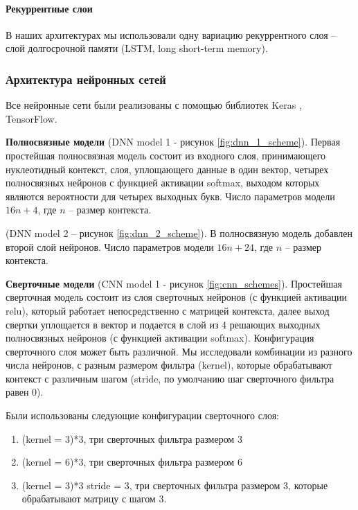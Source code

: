 \paragraph{Рекуррентные слои} В наших архитектурах мы использовали одну вариацию рекуррентного слоя -- слой долгосрочной памяти (LSTM, long short-term memory). 
  
\subsubsection{Архитектура нейронных сетей}
Все нейронные сети были реализованы с помощью библиотек Keras\cite{chollet_keras_2015} , TensorFlow.



{\bfseries Полносвязные модели} (DNN model 1 - рисунок \ref{fig:dnn_1_scheme}). Первая простейшая полносвязная модель состоит из входного слоя, принимающего нуклеотидный контекст, слоя, уплощающего данные в один вектор, четырех полносвязных нейронов с функцией активации softmax, выходом которых являются вероятности для четырех выходных букв. Число параметров модели $16n + 4$, где $n$ -- размер контекста.

(DNN model 2 -- рисунок \ref{fig:dnn_2_scheme}). В полносвязную модель добавлен второй слой нейронов. Число параметров модели $16n + 24$, где $n$ -- размер контекста.


{\bfseries Сверточные модели} (CNN model 1 - рисунок \ref{fig:cnn_schemes}).
Простейшая сверточная модель состоит из слоя сверточных нейронов (с функцией активации relu), который работает непосредственно с матрицей контекста, далее выход свертки уплощается в вектор и подается в слой из 4 решающих выходных полносвязных нейронов (с функцией активации softmax). Конфигурация сверточного слоя может быть различной. Мы исследовали комбинации из разного числа нейронов, с разным размером фильтра (kernel), которые обрабатывают контекст с различным шагом (stride, по умолчанию шаг сверточного фильтра равен 0).

Были использованы следующие конфигурации сверточного слоя: \begin{enumerate}
		\item (kernel = 3)*3, три сверточных фильтра размером 3
		\item (kernel = 6)*3, три сверточных фильтра размером 6
		\item (kernel = 3)*3 stride = 3, три сверточных фильтра размером 3, которые обрабатывают матрицу с шагом 3.
	\end{enumerate}
 
